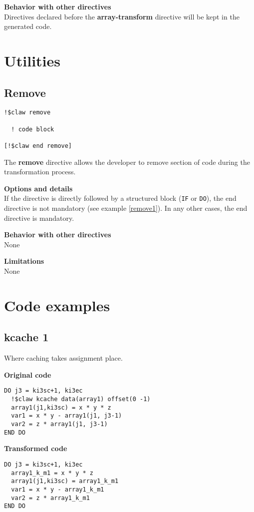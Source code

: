 \documentclass{article}
\begin{document}
\textbf{Behavior with other directives}\\
Directives declared before the \textbf{array-transform} directive will be kept in the
generated code.

\section{Utilities}

\subsection{Remove}
\begin{lstlisting}
!$claw remove

  ! code block
  
[!$claw end remove]
\end{lstlisting}

The \textbf{remove} directive allows the developer to remove section of code
during the transformation process. 

\textbf{Options and details}\\
If the directive is directly followed by a structured block (\lstinline!IF! or \lstinline!DO!), the
end directive is not mandatory (see example \ref{remove1}). In any other cases, the end
directive is mandatory.

\textbf{Behavior with other directives}\\
None

\textbf{Limitations}\\
None


\appendix

\section{Code examples}

\subsection{kcache 1}
\label{kcache1}
Where caching takes assignment place. 

\textbf{Original code}
\begin{lstlisting}
DO j3 = ki3sc+1, ki3ec
  !$claw kcache data(array1) offset(0 -1)
  array1(j1,ki3sc) = x * y * z
  var1 = x * y - array1(j1, j3-1)
  var2 = z * array1(j1, j3-1)
END DO
\end{lstlisting}


\textbf{Transformed code}
\begin{lstlisting}
DO j3 = ki3sc+1, ki3ec
  array1_k_m1 = x * y * z
  array1(j1,ki3sc) = array1_k_m1
  var1 = x * y - array1_k_m1
  var2 = z * array1_k_m1
END DO
\end{lstlisting}
\end{document}
